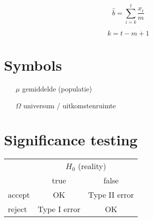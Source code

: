 \documentclass[a4paper]{article}
\begin{document}
\begin{equation}
\widehat{b} = \sum_{i=k}^t \frac{x_i}{m}
\end{equation}

\[k = t - m + 1\]

\section{Symbols}

\begin{itemize}
\item[$\mu$] gemiddelde (populatie)
\item[$\Omega$] universum / uitkomstenruimte
\end{itemize}

\section{Significance testing}

\begin{tabular}{l|c|c}
& \multicolumn{2}{c}{$H_{0}$ (reality)} \\
& true & false \\ \hline
accept & OK & Type II error \\
reject & Type I error & OK \\
\end{tabular}

\onecolumn
\end{document}
